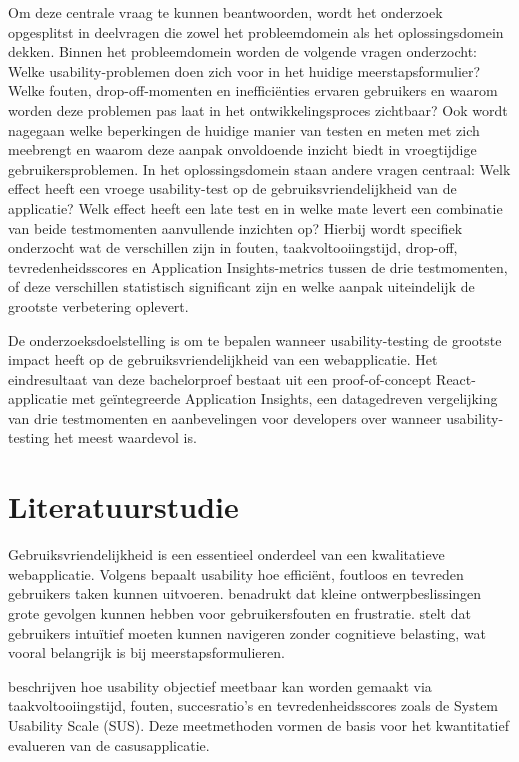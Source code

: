 Om deze centrale vraag te kunnen beantwoorden, wordt het onderzoek opgesplitst in deelvragen die zowel het probleemdomein als het oplossingsdomein dekken.
Binnen het probleemdomein worden de volgende vragen onderzocht: Welke usability-problemen doen zich voor in het huidige meerstapsformulier? Welke fouten, drop-off-momenten en inefficiënties ervaren gebruikers en waarom worden deze problemen pas laat in het ontwikkelingsproces zichtbaar? Ook wordt nagegaan welke beperkingen de huidige manier van testen en meten met zich meebrengt en waarom deze aanpak onvoldoende inzicht biedt in vroegtijdige gebruikersproblemen.
In het oplossingsdomein staan andere vragen centraal: Welk effect heeft een vroege usability-test op de gebruiksvriendelijkheid van de applicatie? Welk effect heeft een late test en in welke mate levert een combinatie van beide testmomenten aanvullende inzichten op? Hierbij wordt specifiek onderzocht wat de verschillen zijn in fouten, taakvoltooiingstijd, drop-off, tevredenheidsscores en Application Insights-metrics tussen de drie testmomenten, of deze verschillen statistisch significant zijn en welke aanpak uiteindelijk de grootste verbetering oplevert.

De onderzoeksdoelstelling is om te bepalen wanneer usability-testing de grootste impact heeft op de gebruiksvriendelijkheid van een webapplicatie. 
Het eindresultaat van deze bachelorproef bestaat uit een proof-of-concept React-applicatie met geïntegreerde Application Insights, een datagedreven vergelijking van drie testmomenten en aanbevelingen voor developers over wanneer usability-testing het meest waardevol is.

\section{Literatuurstudie}%
\label{sec:literatuurstudie}

Gebruiksvriendelijkheid is een essentieel onderdeel van een kwalitatieve webapplicatie. Volgens \textcite{Nielsen2021} bepaalt usability hoe efficiënt, foutloos en tevreden gebruikers taken kunnen uitvoeren. \textcite{Norman2013} benadrukt dat kleine ontwerpbeslissingen grote gevolgen kunnen hebben voor gebruikersfouten en frustratie. 
\textcite{Krug2014} stelt dat gebruikers intuïtief moeten kunnen navigeren zonder cognitieve belasting, wat vooral belangrijk is bij meerstapsformulieren.

\textcite{SauroLewis2016} beschrijven hoe usability objectief meetbaar kan worden gemaakt via taakvoltooiingstijd, fouten, succesratio's en tevredenheidsscores zoals de System Usability Scale (SUS). Deze meetmethoden vormen de basis voor het kwantitatief evalueren van de casusapplicatie.

